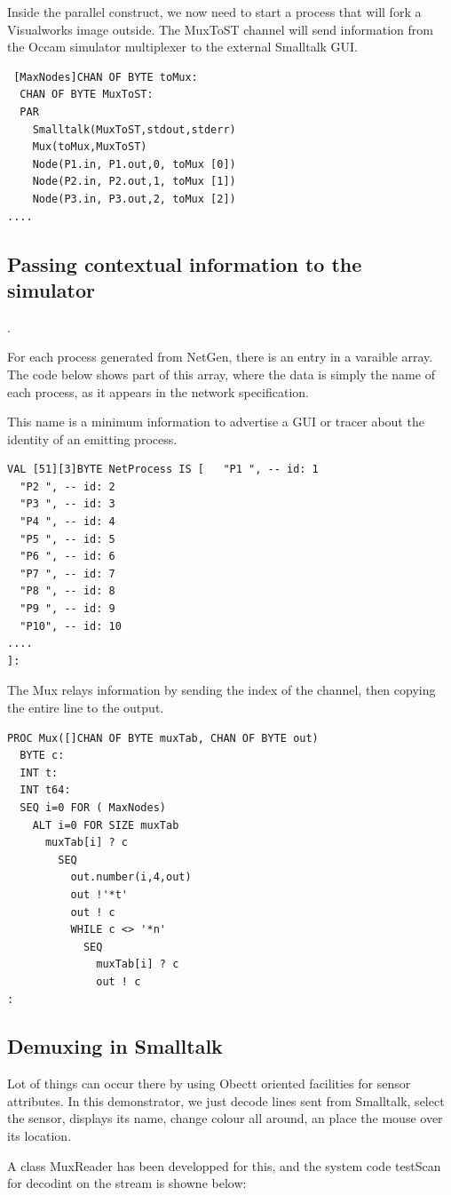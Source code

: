 Inside the parallel construct, we now need to start a process that will fork a 
Visualworks image outside. The MuxToST channel will send information from
the Occam simulator multiplexer to the external Smalltalk GUI.
\begin{lstlisting} 
 [MaxNodes]CHAN OF BYTE toMux:
  CHAN OF BYTE MuxToST:
  PAR
    Smalltalk(MuxToST,stdout,stderr)
    Mux(toMux,MuxToST)
    Node(P1.in, P1.out,0, toMux [0])
    Node(P2.in, P2.out,1, toMux [1])
    Node(P3.in, P3.out,2, toMux [2])
....
\end{lstlisting}

\subsection{Passing contextual information to the simulator}.


For each process generated from NetGen, there is an entry in a varaible array.
The code below shows part of this array, where the data is simply the name 
of each process, as it appears in the network specification.

This name is a minimum information to advertise a GUI or tracer about the identity 
of an emitting process. 

\begin{lstlisting} 
VAL [51][3]BYTE NetProcess IS [   "P1 ", -- id: 1
  "P2 ", -- id: 2
  "P3 ", -- id: 3
  "P4 ", -- id: 4
  "P5 ", -- id: 5
  "P6 ", -- id: 6
  "P7 ", -- id: 7
  "P8 ", -- id: 8
  "P9 ", -- id: 9
  "P10", -- id: 10
....
]:
 \end{lstlisting}

The Mux relays information by sending the index of the channel, then copying the entire line to the
output.
 

\begin{lstlisting}
PROC Mux([]CHAN OF BYTE muxTab, CHAN OF BYTE out)
  BYTE c: 
  INT t:
  INT t64: 
  SEQ i=0 FOR ( MaxNodes)
    ALT i=0 FOR SIZE muxTab
      muxTab[i] ? c
        SEQ 
          out.number(i,4,out) 
          out !'*t'
          out ! c
          WHILE c <> '*n'
            SEQ
              muxTab[i] ? c
              out ! c
:
 \end{lstlisting}
\subsection {Demuxing in Smalltalk }

Lot of things can occur there by using Obectt oriented facilities for sensor attributes. In this demonstrator, 
we just decode lines sent from Smalltalk, select the sensor, displays its name, change colour all around,
an place the mouse over its location.

A class MuxReader has been developped for this, and the system code testScan  for decodint on the stream is showne below:




